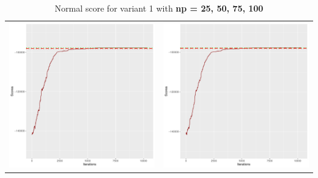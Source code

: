 \documentclass[]{scrartcl}
\begin{document}
\begin{table}[h!]
\begin{tabular}{cc}
\includegraphics[scale = 0.4]{./figs/hepar2/v1/75/boundsEvolution-10352.pdf} & 
\includegraphics[scale = 0.4]{./figs/hepar2/v1/100/boundsEvolution-10352.pdf} \\
\end{tabular}
\caption{Normal score for variant 1 with \textbf{np =  25, 50, 75, 100 }}
\end{table}
\end{document}
